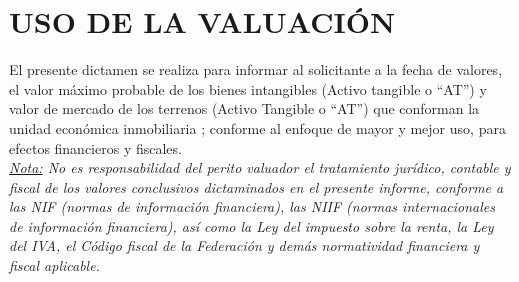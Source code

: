 \section{USO DE LA VALUACI\'ON}\label{uso}\label{sec:i}
El presente dictamen se realiza para informar al solicitante a la fecha de valores, el valor m\'aximo probable de los bienes intangibles (Activo tangible o ``AT'') y valor de mercado de los terrenos (Activo Tangible o ``AT'') que conforman la unidad econ\'omica inmobiliaria \empresaCorto; conforme al enfoque de mayor y mejor uso, para efectos financieros y fiscales.\\


\textit{\underline{Nota:} No es responsabilidad del perito valuador el tratamiento jur\'idico, contable y fiscal de los valores conclusivos dictaminados en el presente informe, conforme a las NIF (normas de informaci\'on financiera), las NIIF (normas internacionales de informaci\'on financiera), as\'i como la Ley del impuesto sobre la renta, la Ley del IVA, el C\'odigo fiscal de la Federaci\'on y dem\'as normatividad financiera y fiscal aplicable.}